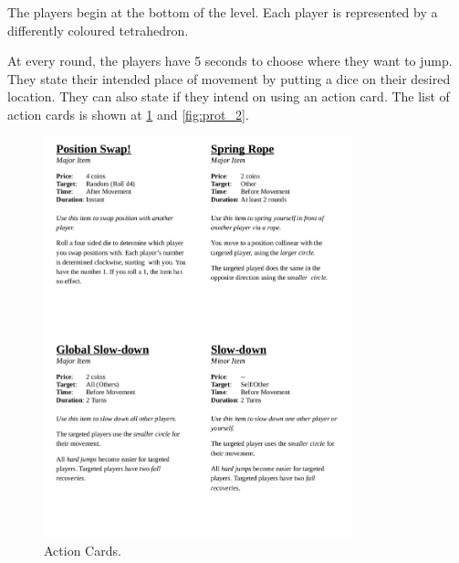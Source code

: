 The players begin at the bottom of the level. Each player is represented by a differently coloured tetrahedron.

At every round, the players have 5 seconds to choose where they want to jump. They state their intended place of movement by putting a dice on their desired location. They can also state if they intend on using an action card. The list of action cards is shown at \ref{fig:prot_1} and \ref{fig:prot_2}.



\begin{figure}
    \centering
    \includegraphics[width=0.8\textwidth]{figures/Prototype/topmeifyoucan_1.png}
    \caption{Action Cards.}
    \label{fig:prot_1}
\end{figure}



